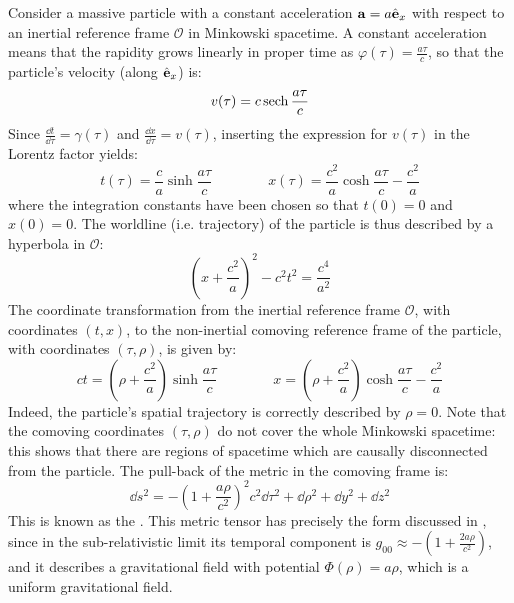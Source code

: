 Consider a massive particle with a constant acceleration $ \mathbf{a} = a \hat{\mathbf{e}}_x $ with respect to an inertial reference frame $ \mathcal{O} $ in Minkowski spacetime. A constant acceleration means that the rapidity grows linearly in proper time as $ \varphi(\tau) = \frac{a \tau}{c} $, so that the particle's velocity (along $ \hat{\mathbf{e}}_x $) is:
\begin{equation}
  v(\tau) = c \operatorname{sech} \frac{a \tau}{c}
\end{equation}
Since $ \frac{\dd t}{\dd \tau} = \gamma(\tau) $ and $ \frac{\dd x}{\dd \tau} = v(\tau) $, inserting the expression for $ v(\tau) $ in the Lorentz factor yields:
\begin{equation}
  t(\tau) = \frac{c}{a} \sinh \frac{a \tau}{c}
  \qquad \qquad
  x(\tau) = \frac{c^2}{a} \cosh \frac{a \tau}{c} - \frac{c^2}{a}
\end{equation}
where the integration constants have been chosen so that $ t(0) = 0 $ and $ x(0) = 0 $. The worldline (i.e. trajectory) of the particle is thus described by a hyperbola in $ \mathcal{O} $:
\begin{equation}
  \left( x + \frac{c^2}{a} \right)^2 - c^2 t^2 = \frac{c^4}{a^2}
\end{equation}
The coordinate transformation from the inertial reference frame $ \mathcal{O} $, with coordinates $ (t,x) $, to the non-inertial comoving reference frame of the particle, with coordinates $ (\tau , \rho) $, is given by:
\begin{equation}
  ct = \left( \rho + \frac{c^2}{a} \right) \sinh \frac{a\tau}{c}
  \qquad \qquad
  x = \left( \rho + \frac{c^2}{a} \right) \cosh \frac{a\tau}{c} - \frac{c^2}{a}
  \label{eq:km-coord}
\end{equation}
Indeed, the particle's spatial trajectory is correctly described by $ \rho = 0 $. Note that the comoving coordinates $ (\tau , \rho) $ do not cover the whole Minkowski spacetime: this shows that there are regions of spacetime which are causally disconnected from the particle. The pull-back of the metric in the comoving frame is:
\begin{equation}
  \dd s^2 = - \left( 1 + \frac{a \rho}{c^2} \right)^2 c^2 \dd \tau^2 + \dd \rho^2 + \dd y^2 + \dd z^2
\end{equation}
This is known as the . This metric tensor has precisely the form discussed in , since in the sub-relativistic limit its temporal component is $ g_{00} \approx - \left( 1 + \frac{2 a \rho}{c^2} \right) $, and it describes a gravitational field with potential $ \Phi(\rho) = a \rho $, which is a uniform gravitational field.

